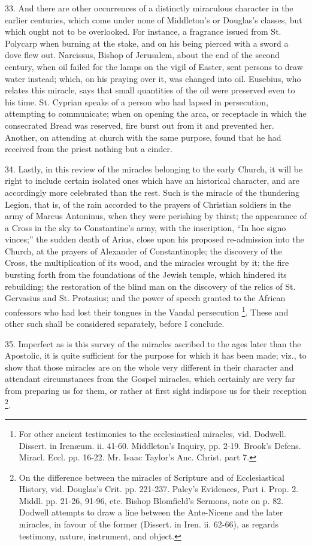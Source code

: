 33.
And there are other occurrences of a distinctly miraculous character
in the earlier centuries, which come under none of Middleton's or
Douglas's classes, but which ought not to be overlooked. For instance,
a fragrance issued from St. Polycarp when burning at the stake, and on
his being pierced with a sword a dove flew out. Narcissus, Bishop of
Jerusalem, about the end of the second century, when oil failed for
the lamps on the vigil of Easter, sent persons to draw water
instead; which, on his praying over it, was changed into oil.
Eusebius, who relates this miracle, says that small quantities of the
oil were preserved even to his time. St. Cyprian speaks of a person
who had lapsed in persecution, attempting to communicate; when on
opening the arca, or receptacle in which the consecrated Bread was
reserved, fire burst out from it and prevented her. Another, on
attending at church with the same purpose, found that he had received
from the priest nothing but a cinder.

34.
Lastly, in this review of the miracles belonging to the early Church,
it will be right to include certain isolated ones which have an
historical character, and are accordingly more celebrated than the
rest. Such is the miracle of the thundering Legion, that is, of the
rain accorded to the prayers of Christian soldiers in the army of
Marcus Antoninus, when they were perishing by thirst; the appearance
of a Cross in the sky to Constantine's army, with the inscription, ``In
hoc signo vinces;'' the sudden death of Arius, close upon his proposed
re-admission into the Church, at the prayers of Alexander of
Constantinople; the discovery of the Cross, the multiplication of its
wood, and the miracles wrought by it; the fire bursting forth from the
foundations of the Jewish temple, which hindered its rebuilding; the
restoration of the blind man on the discovery of the relics of St.
Gervasius and St. Protasius; and the power of speech granted to
the African confessors who had lost their tongues in the Vandal
persecution \footnote{For other ancient testimonies to the
ecclesiastical miracles, vid. Dodwell. Dissert. in Irenæum. ii.
41-60. Middleton's Inquiry, pp. 2-19. Brook's Defens. Miracl. Eccl.
pp. 16-22. Mr. Isaac Taylor's Anc. Christ. part 7.}. These and other such shall be considered
separately, before I conclude.

35.
Imperfect as is this survey of the miracles ascribed to the ages later
than the Apostolic, it is quite sufficient for the purpose for which
it has been made; viz., to show that those miracles are on the whole
very different in their character and attendant circumstances from the
Gospel miracles, which certainly are very far from preparing us for
them, or rather at first sight indispose us for their reception \footnote{On the difference between the miracles of
Scripture and of Ecclesiastical History, vid. Douglas's Crit. pp.
221-237. Paley's Evidences, Part i. Prop. 2. Middl. pp. 21-26, 91-96,
etc. Bishop Blomfield's Sermons, note on p. 82. Dodwell attempts to
draw a line between the Ante-Nicene and the later miracles, in favour
of the former (Dissert. in Iren. ii. 62-66), as regards testimony,
nature, instrument, and object.}.

